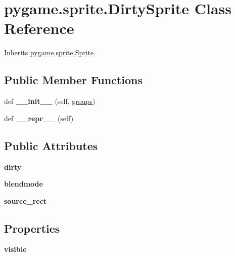 \hypertarget{classpygame_1_1sprite_1_1_dirty_sprite}{}\section{pygame.\+sprite.\+Dirty\+Sprite Class Reference}
\label{classpygame_1_1sprite_1_1_dirty_sprite}


Inherits \hyperlink{classpygame_1_1sprite_1_1_sprite}{pygame.\+sprite.\+Sprite}.

\subsection*{Public Member Functions}
\begin{DoxyCompactItemize}
\item 
\mbox{\label{classpygame_1_1sprite_1_1_dirty_sprite_aec57b543095c3a64253a24728289335f}} 
def {\bfseries \+\_\+\+\_\+init\+\_\+\+\_\+} (self, \hyperlink{classpygame_1_1sprite_1_1_sprite_a737da7fd292c7463b925d512d0cb1ccf}{groups})
\item 
\mbox{\label{classpygame_1_1sprite_1_1_dirty_sprite_a365a001694a093bfbeb4c2b747d7382c}} 
def {\bfseries \+\_\+\+\_\+repr\+\_\+\+\_\+} (self)
\end{DoxyCompactItemize}
\subsection*{Public Attributes}
\begin{DoxyCompactItemize}
\item 
\mbox{\label{classpygame_1_1sprite_1_1_dirty_sprite_a1ff1ab245cf4388307136a7b69c399c4}} 
{\bfseries dirty}
\item 
\mbox{\label{classpygame_1_1sprite_1_1_dirty_sprite_aa29ba1d716f56998671d604e74ad9a91}} 
{\bfseries blendmode}
\item 
\mbox{\label{classpygame_1_1sprite_1_1_dirty_sprite_a403f1b5bfefe24a52a14231e5dd0a655}} 
{\bfseries source\+\_\+rect}
\end{DoxyCompactItemize}
\subsection*{Properties}
\begin{DoxyCompactItemize}
\item 
{\bfseries visible}
\end{DoxyCompactItemize}


